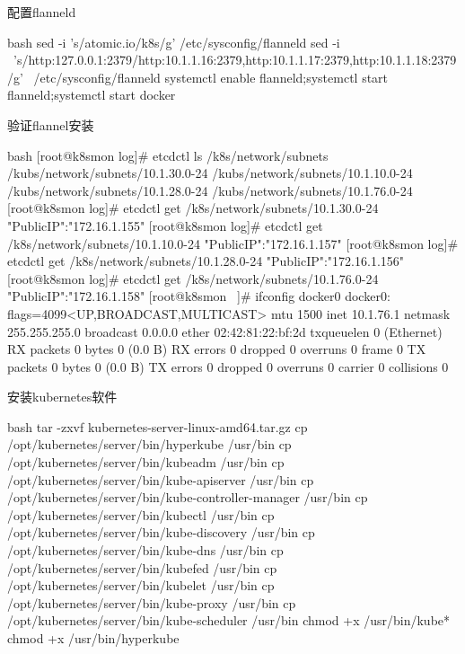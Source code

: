 \begin{outline}[enumerate]
  \1 配置flanneld
\begin{code-in-enumerate}{bash}
sed -i 's/atomic.io/k8s/g' /etc/sysconfig/flanneld
sed -i \
    's/http:\/\/127.0.0.1:2379/http:\/\/10.1.1.16:2379,http:\/\/10.1.1.17:2379,http:\/\/10.1.1.18:2379/g' \
    /etc/sysconfig/flanneld
systemctl enable flanneld;systemctl start flanneld;systemctl start docker
\end{code-in-enumerate}

  \1 验证flannel安装
\begin{code-in-enumerate}{bash}
[root@k8smon log]# etcdctl ls /k8s/network/subnets
/kubs/network/subnets/10.1.30.0-24
/kubs/network/subnets/10.1.10.0-24
/kubs/network/subnets/10.1.28.0-24
/kubs/network/subnets/10.1.76.0-24
[root@k8smon log]# etcdctl get /k8s/network/subnets/10.1.30.0-24
{"PublicIP":"172.16.1.155"}
[root@k8smon log]# etcdctl get /k8s/network/subnets/10.1.10.0-24
{"PublicIP":"172.16.1.157"}
[root@k8smon log]# etcdctl get /k8s/network/subnets/10.1.28.0-24
{"PublicIP":"172.16.1.156"}
[root@k8smon log]# etcdctl get /k8s/network/subnets/10.1.76.0-24
{"PublicIP":"172.16.1.158"}
[root@k8smon ~]# ifconfig docker0
docker0: flags=4099<UP,BROADCAST,MULTICAST>  mtu 1500
        inet 10.1.76.1  netmask 255.255.255.0  broadcast 0.0.0.0
        ether 02:42:81:22:bf:2d  txqueuelen 0  (Ethernet)
        RX packets 0  bytes 0 (0.0 B)
        RX errors 0  dropped 0  overruns 0  frame 0
        TX packets 0  bytes 0 (0.0 B)
        TX errors 0  dropped 0 overruns 0  carrier 0  collisions 0
\end{code-in-enumerate}

  \1 安装kubernetes软件
\begin{code-in-enumerate}{bash}
tar -zxvf kubernetes-server-linux-amd64.tar.gz
cp /opt/kubernetes/server/bin/hyperkube /usr/bin
cp /opt/kubernetes/server/bin/kubeadm /usr/bin
cp /opt/kubernetes/server/bin/kube-apiserver /usr/bin
cp /opt/kubernetes/server/bin/kube-controller-manager /usr/bin
cp /opt/kubernetes/server/bin/kubectl /usr/bin
cp /opt/kubernetes/server/bin/kube-discovery /usr/bin
cp /opt/kubernetes/server/bin/kube-dns /usr/bin
cp /opt/kubernetes/server/bin/kubefed /usr/bin
cp /opt/kubernetes/server/bin/kubelet /usr/bin
cp /opt/kubernetes/server/bin/kube-proxy /usr/bin
cp /opt/kubernetes/server/bin/kube-scheduler /usr/bin
chmod +x /usr/bin/kube*
chmod +x /usr/bin/hyperkube
\end{code-in-enumerate}


\end{outline}
